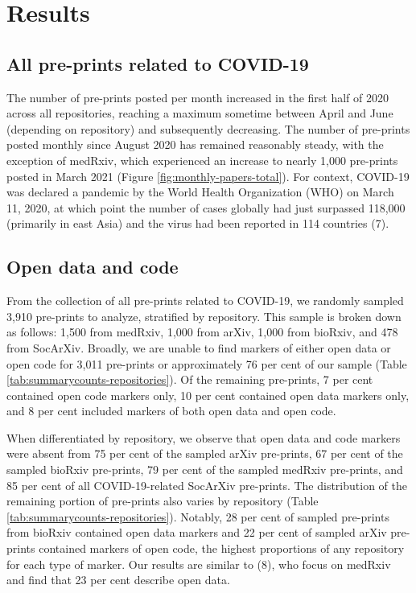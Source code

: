 \documentclass[
]{article}
\begin{document}
\hypertarget{results}{%
\section{Results}\label{results}}

\hypertarget{all-pre-prints-related-to-covid-19}{%
\subsection{All pre-prints related to COVID-19}\label{all-pre-prints-related-to-covid-19}}

The number of pre-prints posted per month increased in the first half of 2020 across all repositories, reaching a maximum sometime between April and June (depending on repository) and subsequently decreasing. The number of pre-prints posted monthly since August 2020 has remained reasonably steady, with the exception of medRxiv, which experienced an increase to nearly 1,000 pre-prints posted in March 2021 (Figure \ref{fig:monthly-papers-total}). For context, COVID-19 was declared a pandemic by the World Health Organization (WHO) on March 11, 2020, at which point the number of cases globally had just surpassed 118,000 (primarily in east Asia) and the virus had been reported in 114 countries (7).

\hypertarget{open-data-and-code}{%
\subsection{Open data and code}\label{open-data-and-code}}

From the collection of all pre-prints related to COVID-19, we randomly sampled 3,910 pre-prints to analyze, stratified by repository. This sample is broken down as follows: 1,500 from medRxiv, 1,000 from arXiv, 1,000 from bioRxiv, and 478 from SocArXiv. Broadly, we are unable to find markers of either open data or open code for 3,011 pre-prints or approximately 76 per cent of our sample (Table \ref{tab:summarycounts-repositories}). Of the remaining pre-prints, 7 per cent contained open code markers only, 10 per cent contained open data markers only, and 8 per cent included markers of both open data and open code.

When differentiated by repository, we observe that open data and code markers were absent from 75 per cent of the sampled arXiv pre-prints, 67 per cent of the sampled bioRxiv pre-prints, 79 per cent of the sampled medRxiv pre-prints, and 85 per cent of all COVID-19-related SocArXiv pre-prints. The distribution of the remaining portion of pre-prints also varies by repository (Table \ref{tab:summarycounts-repositories}). Notably, 28 per cent of sampled pre-prints from bioRxiv contained open data markers and 22 per cent of sampled arXiv pre-prints contained markers of open code, the highest proportions of any repository for each type of marker. Our results are similar to (8), who focus on medRxiv and find that 23 per cent describe open data.
\end{document}
